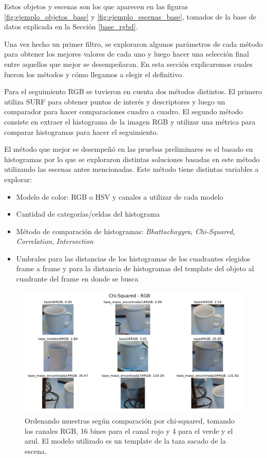 Estos objetos y escenas son los que aparecen en las figuras \ref{fig:ejemplo_objetos_base} y \ref{fig:ejemplo_escenas_base}, tomados de la base de datos explicada en la Sección \ref{base_rgbd}.

Una vez hecho un primer filtro, se exploraron algunos parámetros de cada método para obtener los mejores valores de cada uno y luego hacer una selección final entre aquellos que mejor se desempeñaran. En esta sección explicaremos cuales fueron los métodos y cómo llegamos a elegir el definitivo.

Para el seguimiento RGB se tuvieron en cuenta dos métodos distintos. El primero utiliza SURF \cite{surf} para obtener puntos de interés y descriptores y luego un comparador para hacer comparaciones cuadro a cuadro. El segundo método consiste en extraer el histograma de la imagen RGB y utilizar una métrica para comparar histogramas para hacer el seguimiento.

El método que mejor se desempeñó en las pruebas preliminares es el basado en histogramas por lo que se exploraron distintas soluciones basadas en este método utilizando las escenas antes mencionadas. Este método tiene distintas variables a explorar:
\begin{itemize}
	\item Modelo de color: RGB o HSV y canales a utilizar de cada modelo
	\item Cantidad de categorías/celdas del histograma
	\item Método de comparación de histogramas: \textit{Bhattachayyra}, \textit{Chi-Squared}, \textit{Correlation}, \textit{Intersection}
	\item Umbrales para las distancias de los histogramas de los cuadrantes elegidos frame a frame y para la distancia de histogramas del template del objeto al cuadrante del frame en donde se busca
\end{itemize}


\begin{figure}
	\centering
	\includegraphics[width=\textwidth]{img/results_chi-squared_rgb_16r_4g_4b.png}
	\caption{Ordenando muestras según comparación por chi-squared, tomando los canales RGB, 16 bines para el canal rojo y 4 para el verde y el azul. El modelo utilizado es un template de la taza sacado de la escena.}
	\label{pruebas_eleccion_canales}
\end{figure}

